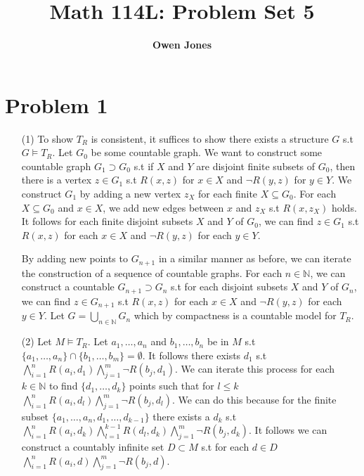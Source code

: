 \documentclass[10pt]{article}
\title{\bf Math 114L\@: Problem Set 5}
\author{\bf Owen Jones}
\begin{document}
\maketitle
\section*{Problem 1}
\begin{itemize}
    \item [(1)] To show $T_R$ is consistent, it suffices to show there exists a structure $G$ s.t $G\models T_R$.
    Let $G_0$ be some countable graph. 
    We want to construct some countable graph $G_1\supset G_0$ s.t if $X$ and $Y$ are disjoint finite subsets of $G_0$, then there is a vertex $z\in G_1$ s.t $R(x,z)$ for $x\in X$ and $\lnot R(y,z)$ for $y\in Y$.
    We construct $G_1$ by adding a new vertex $z_X$ for each finite $X\subseteq G_0$. 
    For each $X\subseteq G_0$ and $x\in X$, we add new edges between $x$ and $z_X$ s.t $R(x,z_X)$ holds. 
    It follows for each finite disjoint subsets $X$ and $Y$ of $G_0$, we can find $z\in G_1$ s.t $R(x,z)$ for each $x\in X$ and $\lnot R(y,z)$ for each $y\in Y$.

    By adding new points to $G_{n+1}$ in a similar manner as before, we can iterate the construction of a sequence of countable graphs. 
    For each $n\in\mathbb{N}$, we can construct a countable $G_{n+1}\supset G_{n}$ s.t for each disjoint subsets $X$ and $Y$ of $G_n$, we can find $z\in G_{n+1}$ s.t $R(x,z)$ for each $x\in X$ and $\lnot R(y,z)$ for each $y\in Y$.
    Let $G=\underset{n\in\mathbb{N}}{\bigcup}G_n$ which by compactness is a countable model for $T_R$.
    \item [(2)] Let $M\models T_R$. Let $a_1,\ldots, a_n$ and $b_1,\ldots, b_n$ be in $M$ s.t $\{a_1,\ldots, a_n\}\cap\{b_1,\ldots, b_m\}=\emptyset$.
    It follows there exists $d_1$ s.t $\bigwedge_{i=1}^n R(a_i,d_1)\bigwedge_{j=1}^m \lnot R(b_j,d_1)$. 
    We can iterate this process for each $k\in\mathbb{N}$ to find $\{d_1,\ldots,d_k\}$ points such that for $l\le k$ $\bigwedge_{i=1}^n R(a_i,d_l)\bigwedge_{j=1}^m \lnot R(b_j,d_l)$. 
    We can do this because for the finite subset $\{a_1,\ldots,a_n,d_1,\ldots,d_{k-1}\}$ there exists a $d_k$ s.t $\bigwedge_{i=1}^n R(a_i,d_k)\bigwedge_{l=1}^{k-1} R(d_l,d_k)\bigwedge_{j=1}^m \lnot R(b_j,d_k)$.
    It follows we can construct a countably infinite set $D\subset M$ s.t for each $d\in D$ $\bigwedge_{i=1}^n R(a_i,d)\bigwedge_{j=1}^m \lnot R(b_j,d)$.
\end{itemize}
\end{document}

